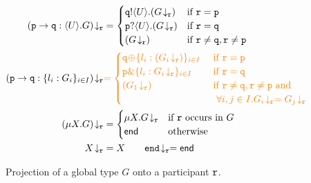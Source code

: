 \documentclass[runningheads]{llncs}
\newcommand{\erase}[1]{\textcolor{orange}{#1}}
\begin{document}
\begin{figure}[t!]
{%
\begin{align*}
\tproj{(\gtcom{p}{q}{U}{G})}{\gpart{r}} & = 
\begin{cases}
\ltout{\q}{U}{(\tproj{G}{\gpart{r}})} & \text{if $\gpart{r} = \gpart{p}$} \\
\ltinp{\p}{U}{(\tproj{G}{\gpart{r}})} & \text{if $\gpart{r} = \gpart{q}$} \\
(\tproj{G}{\gpart{r}}) &  \text{if $\gpart{r} \neq \gpart{q}, \gpart{r} \neq \gpart{p}$}
\end{cases}
\\
\tproj{(\gtcho{p}{q}{l_i}{G_i})}{\gpart{r}}  
& 
\erase{= 
\begin{cases}
\ltsel{\q}{\lbl_i}{(\tproj{G_i}{\gpart{r}})}{i}{I}  & \text{ if $\gpart{r} = \gpart{p}$} \\
\ltbra{\p}{\lbl_i}{\tproj{G_i}{\gpart{r}}}{i}{I}  & \text{ if $\gpart{r} = \gpart{q}$} \\
(\tproj{{G_1}}{\gpart{r}}) &  \text{ if $\gpart{r} \neq \gpart{q}, \gpart{r} \neq \gpart{p}$ and} \\ 
& \text{~~$\forall i, j \in I. \tproj{{G_i}}{\gpart{r}} = \tproj{{G_j}}{\gpart{r}}$}
\end{cases}
}
\\
\tproj{(\mu X. G)}{\gpart{r}} &= 
\begin{cases}
\mu X. \tproj{G}{\gpart{r}} & \text{if $\gpart{r}$ occurs in $G$}
\\
\lend & \text{otherwise}
\end{cases}
\\
\tproj{X}{\gpart{r}} & = X
\qquad
\tproj{\gend}{\gpart{r}} = \lend
\end{align*}
}
\vspace{-4mm}
\caption{Projection of a global type $G$ onto a participant $\mathtt{r}$.\label{f:proj}}
\end{figure}
\end{document}
